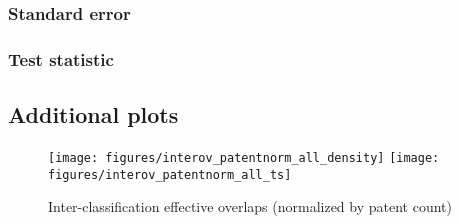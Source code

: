 \documentclass[10pt,A4]{article}
\begin{document}
\subsubsection*{Standard error}

\subsubsection*{Test statistic}







\subsection*{Additional plots}



\begin{figure}[!ht]
\texttt{[image: figures/interov\_patentnorm\_all\_density]}
\texttt{[image: figures/interov\_patentnorm\_all\_ts]}\\
\caption{Inter-classification effective overlaps (normalized by patent count)}
\end{figure}






















\end{document}
